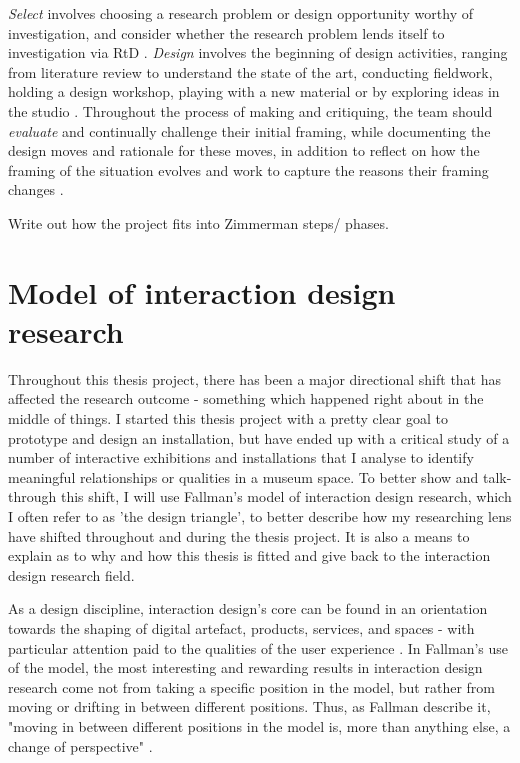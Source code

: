 \emph{Select} involves choosing a research problem or design opportunity worthy of investigation, and consider whether the research problem lends itself to investigation via RtD \autocite[p. 185]{zimmerman_research_2014}. \emph{Design} involves the beginning of design activities, ranging from literature review to understand the state of the art, conducting fieldwork, holding a design workshop, playing with a new material or by exploring ideas in the studio \autocite[p. 185]{zimmerman_research_2014}. Throughout the process of making and critiquing, the team should \emph{evaluate} and continually challenge their initial framing, while documenting the design moves and rationale for these moves, in addition to reflect on how the framing of the situation evolves and work to capture the reasons their framing changes \autocite[p. 185]{zimmerman_research_2014}.


Write out how the project fits into Zimmerman steps/ phases.

\section{Model of interaction design research}
Throughout this thesis project, there has been a major directional shift that has affected the research outcome - something which happened right about in the middle of things. I started this thesis project with a pretty clear goal to prototype and design an installation, but have ended up with a critical study of a number of interactive exhibitions and installations that I analyse to identify meaningful relationships or qualities in a museum space. To better show and talk-through this shift, I will use Fallman's model of interaction design research, which I often refer to as 'the design triangle', to better describe how my researching lens have shifted throughout and during the thesis project. It is also a means to explain as to why and how this thesis is fitted and give back to the interaction design research field.

As a design discipline, interaction design’s core can be found in an orientation towards the shaping of digital artefact, products, services, and spaces - with particular attention paid to the qualities of the user experience \autocite[p. 4]{fallman_triangle_2008}. In Fallman’s use of the model, the most interesting and rewarding results in interaction design research come not from taking a specific position in the model, but rather from moving or drifting in between different positions. Thus, as Fallman describe it, "moving in between different positions in the model is, more than anything else, a change of perspective" \autocite[p. 10]{fallman_triangle_2008}.


